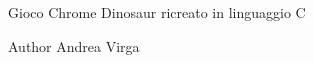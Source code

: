 Gioco Chrome Dinosaur ricreato in linguaggio C \begin{DoxyAuthor}{Author}
Andrea Virga 
\end{DoxyAuthor}

